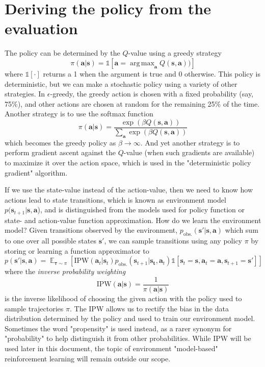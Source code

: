 \documentclass{article}
\DeclareMathOperator*{\argmax}{arg\,max}
\begin{document}
\section{Deriving the policy from the evaluation}
The policy can be determined by the $Q$-value using a greedy strategy
\begin{equation}\label{eq:greedy_policy}
    \pi(\mathbf{a}|\mathbf{s})=\mathbb{1}\left[\mathbf{a}=\argmax_\mathbf{a}Q(\mathbf{s},\mathbf{a}))\right]
\end{equation}where $\mathbb{1}[\cdot]$ returns a 1 when the argument is true and 0 otherwise. This policy is deterministic, but we can make a stochastic policy using a variety of other strategies. In $\epsilon$-greedy, the greedy action is chosen with a fixed probability (say, 75\%), and other actions are chosen at random for the remaining 25\% of the time. Another strategy is to use the softmax function
\begin{equation}
  \pi(\mathbf{a}|\mathbf{s})=\frac{\exp(\beta Q(\mathbf{s},\mathbf{a}))}{\sum_\mathbf{a}\exp(\beta Q(\mathbf{s},\mathbf{a}))}
\end{equation}which becomes the greedy policy as $\beta\rightarrow\infty$. And yet another strategy is to perform gradient ascent against the $Q$-value (when such gradients are available) to maximize it over the action space, which is used in the "deterministic policy gradient" algorithm\cite{DDPG}.

If we use the state-value instead of the action-value, then we need to know how actions lead to state transitions, which is known as environment model $p(\mathbf{s}_{t+1}|\mathbf{s},\mathbf{a}$), and is distinguished from the models used for policy function or state- and action-value function approximation. How do we learn the environment model? Given transitions observed by the environment, $p_\text{obs.}(\mathbf{s}'|\mathbf{s},\mathbf{a})$ which sum to one over all possible states $\mathbf{s}'$, we can sample transitions using any policy $\pi$ by storing or learning a function approximator to \begin{equation}p(\mathbf{s}'|\mathbf{s},\mathbf{a})=\mathop{\mathbb{E}}_{\boldsymbol{\tau}\sim\pi}\left[\text{IPW}(\mathbf{a}_t|\mathbf{s}_t)p_\text{obs.}(\mathbf{s}_{t+1}|\mathbf{s_t},\mathbf{a}_t)\mathbb{1}\left[\mathbf{s}_t=\mathbf{s},\mathbf{a}_t=\mathbf{a},\mathbf{s}_{t+1}=\mathbf{s}'\right]\right]\end{equation}where the \textit{inverse probability weighting}
\begin{equation}\text{IPW}(\mathbf{a}|\mathbf{s})=\frac{1}{\pi(\mathbf{a}|\mathbf{s})}\end{equation}is the inverse likelihood of choosing the given action with the policy used to sample trajectories $\pi$.  The IPW allows us to rectify the bias in the data distribution determined by the policy and used to train our environment model. Sometimes the word "propensity" is used instead, as a rarer synonym for "probability" to help distinguish it from other probabilities. While IPW will be used later in this document, the topic of environment "model-based" reinforcement learning \cite{model_based_rl_survey} will remain outside our scope.
\end{document}
